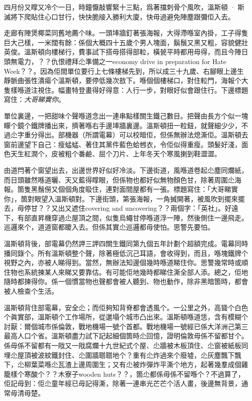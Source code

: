 四月份又𥋇又冷个一日，時鐘懨敲響緊十三點，爲著擋刺骨个風吹，溫斯頓 · 斯滅將下爬貼住心口甘行，快快脆𤗈入勝利大廈，快毋過避免陣塵跟彌佢入去。

走廊有陣煲椰菜同舊地薦个味。一頭埲牆釘著張海報，大得滯喺室內掛，工子得隻巨大己樣，一米闊有餘：係個大概四十五歲个男人塊面，鬍鬚又黑又粗，容貌健壯英俊。溫斯頓向樓梯行，費事試下搭毋搭得部𨋢，橫㼭平時都用毋得，而且今陣日頭無電力，？？仇恨禮拜尐準備之一economy drive in preparation for Hate Week？？。因為佢間單位要行上七條樓梯先到，所以成三十九歲、右腳眼上邊生靜脈曲張性潰瘍个溫斯頓，要停低幾次敨下。喺個個樓梯口，對住𨋢門，海報个大隻樣喺道注視住。幅畫特登畫得好得意：人行一步，對眼好似會跟住行。下邊標題寫住：\emph{大哥睇實你}。

單位裏邊，一把甜味个聲喺道念出一連串點樣關生鐵己數目。把聲由長方个似一塊矇个鏡个鐵牌播出來，擠著喺右手邊埲牆裏邊。溫斯頓扭一粒鈕，就聲細少少，不過尐字重分得出。部機器（所謂電幕）可以校暗佢，但係無辦法熄澌佢。溫斯頓去窗前邊望下自己：瘦蜢蜢、著住其黨件藍色蛤乸衣，令佢似得重瘦。頭髮好淺，面色天生紅潤个，皮被粗个番鹼、屈个刀片、上年冬天个寒風揦到鞋澀澀。

由道閂著个窗望出去，出邊世界好似好冷淡。下邊街道，風喺道卷起尐塵同爛紙，而日頭雖然喺道曬、天又藍得𥋇眼，但係物也都好似無物顏色甘，除著周圍尐海報。箇隻黑鬚僗又個個角度𥄫住，連對面間屋都有一張。標題寫住：「大哥睇實你」，箇對眼望入溫斯頓對。下邊街頭，第張海報，一角搣開著，被風吹到擺來擺去，毋停甘？？又出又遮住covering and uncovering？？兩個字：「英社」。好遠下，有部直昇機穿過尐屋頂之間，似隻烏蠅甘停喺道浮一陣，然後側住一邊飛走。巡邏來个，道道窗都𥊙入去。但係其實尐巡邏都毋使怕。思警先要怕。

溫斯頓背後，部電幕仍然䛅三䛅四關生鐵同第九個五年計劃个超額完成。電幕同時播同錄个。所有溫斯頓整个聲，除著極低沉己耳語，會收得到，而且，喺塊鐵牌个視野之內，亦被人睇得到。當然，無辦法知邊個幾時喺道睇住你。思警幾常時或順住物也系統揀某人來睇又要靠估。有可能佢地幾時都睇住澌全部人添。總之，佢地隨時都揀得你。係一個慣當物也聲都會被人聽到、物也動作，除非黑暗箇時，都會被人檢查个生活。

溫斯頓背住部電幕，安全尐；而佢夠知背脊都會透風个。一公里之外，高聳个白色个眞實部，溫斯頓个工作場所，從邋塌个城市凸出來。溫斯頓喺道恁，含有模糊个討厭：爾個城市係倫敦，戰地機場一號个首都。戰地機場一號經已係大洋洲己第三最高人口个省。溫斯頓盡力試下記起細個箇時尐回憶，證明倫敦毋係不留都甘个。係毋係不留都有一戙又一戙腐爛十九世紀式个屋、尐牆被木板頂住、尐窗被紙板同埋尐屋頂被波紋鐵封住、尐圍牆𦖿𦖿地个？重有尐炸過來个廢墟，尐灰塵飄下飄下，尐柳葉菜喺尐瓦渣上邊周圍生；又有尐被炸彈炸平澌个地方，起著幾羣成個雞籠樣个寒酸个？？木寮子wooden huts？？，箇尐都係毋係不留喺个？不過算了，佢記毋到：佢尐童年經已毋記得澌，除著一連串光芒芒个活人畫，後邊無背景，通常毋清毋楚。

